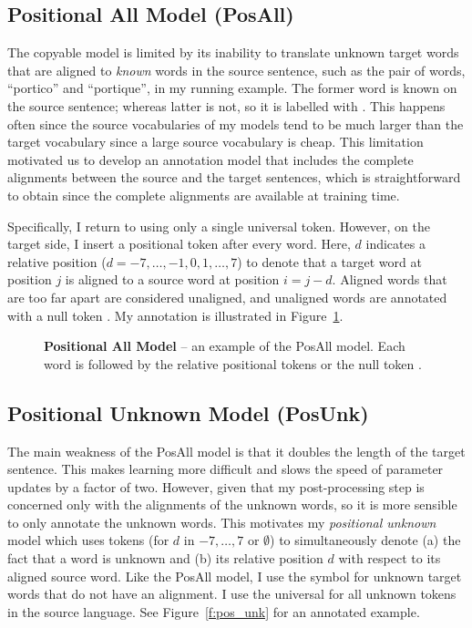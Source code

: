 \subsection{Positional All Model (PosAll)}
The copyable model is limited by its inability to translate unknown 
target words that are aligned to \emph{known} words in the source sentence, such as the pair of 
words, ``portico'' and ``portique'', in my running example. 
The former word is known on the source sentence; whereas latter is not, so it is labelled with \unknull{}.
This happens often since the source vocabularies of my models tend to be much 
larger than the target vocabulary since a large source vocabulary is cheap.
This limitation motivated us to develop an annotation model that includes the complete 
alignments between the source and the target sentences, which is straightforward to obtain
 since the complete alignments are available at training time.  

Specifically, I return to using only a single universal \unksym{} token. 
However, on the target side, 
I insert a positional token  after every word. Here, $d$ indicates a relative position 
($d=-7,\ldots,-1,0,1,\ldots,7$) to denote that a target word at position $j$ is aligned 
to a source word 
at position $i=j-d$. Aligned words that are too far apart are considered unaligned, and 
unaligned words are annotated
with a null token . My annotation is illustrated in 
Figure~\ref{f:pos_all}.

\begin{figure}
\caption[Positional All Model]{ {\bf Positional All Model} -- an example of the PosAll model. Each word is followed by the relative positional tokens  or the null token \posnull{}. }
\label{f:pos_all}
\end{figure}

\subsection{Positional Unknown Model (PosUnk)}

The main weakness of the PosAll model is that it doubles the length of the target sentence. This
makes learning more difficult and slows the speed of parameter updates by a factor of two.
However, given that my post-processing step is concerned only with the alignments of the unknown words,
so it is more sensible to only annotate the unknown words. 
This motivates my {\it positional unknown} model which uses  
tokens (for $d$ in $-7,\ldots,7$ or $\emptyset$) to simultaneously 
denote (a) the fact that a word is unknown and (b) its relative position $d$ with respect to its aligned source word. 
Like the PosAll model, I use the symbol \unkpos{\emptyset} for unknown target words that do not have an alignment. 
I use the universal \unksym{} for all unknown tokens in the source language. See Figure~\ref{f:pos_unk} for an annotated example.


